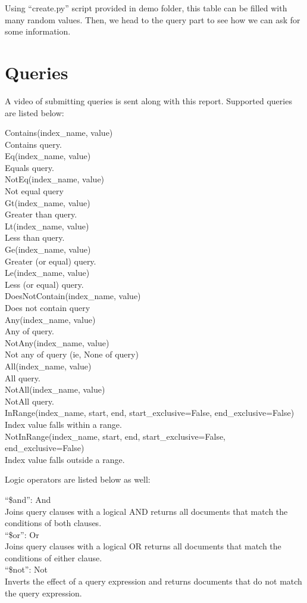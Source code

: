 \documentclass[twoside,twocolumn]{article}
\begin{document}
Using ``create.py'' script provided in demo folder, this table can be filled with many random values. Then, we head to the query part to see how we can ask for some information.
\section{Queries}
A video of submitting queries is sent along with this report. Supported queries are listed below:
\begin{framed}
Contains(index\_name, value)\\
Contains query.\\
Eq(index\_name, value)\\
    Equals query.\\
NotEq(index\_name, value)\\
    Not equal query\\
Gt(index\_name, value)\\
    Greater than query.\\
Lt(index\_name, value)\\
    Less than query.\\
Ge(index\_name, value)\\
    Greater (or equal) query.\\
Le(index\_name, value)\\
    Less (or equal) query.\\
DoesNotContain(index\_name, value)\\
    Does not contain query\\
Any(index\_name, value)\\
    Any of query.\\
NotAny(index\_name, value)\\
    Not any of query (ie, None of query)\\
All(index\_name, value)\\
    All query.\\
NotAll(index\_name, value)\\
    NotAll query.\\
InRange(index\_name, start, end, start\_exclusive=False, end\_exclusive=False)\\
    Index value falls within a range.\\
NotInRange(index\_name, start, end, start\_exclusive=False, end\_exclusive=False)\\
    Index value falls outside a range. 
 \end{framed}

Logic operators are listed below as well:
\begin{framed}

“\$and”: And\\
    Joins query clauses with a logical AND returns all documents that match the conditions of both clauses.\\
“\$or”: Or\\
    Joins query clauses with a logical OR returns all documents that match the conditions of either clause.\\
“\$not”: Not\\
    Inverts the effect of a query expression and returns documents that do not match the query expression. 
\end{framed}
\end{document}
